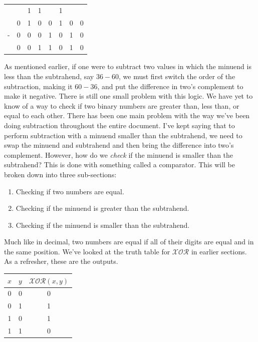 \documentclass[oneside]{book}
\begin{document}
\begin{center}
\begin{tabular}{c c c c c c c c}
& & 1 & 1 & & 1 & & \\
& 0 & 1 & 0 & 0 & 1 & 0 & 0 \\
- & 0 & 0 & 0 & 1 & 0 & 1 & 0\\
\hline
& 0 & 0 & 1 & 1 & 0 & 1 & 0\\
\end{tabular}
\end{center}
\tab
As mentioned earlier, if one were to subtract two values in which the minuend is less than the subtrahend, say $36-60$, we must first switch the order of the subtraction, making it $60-36$, and put the difference in two's complement to make it negative. There is still one small problem with this logic. We have yet to know of a way to check if two binary numbers are greater than, less than, or equal to each other.
\tab
There has been one main problem with the way we've been doing subtraction throughout the entire document. I've kept saying that to perform subtraction with a minuend smaller than the subtrahend, we need to swap the minuend and subtrahend and then bring the difference into two's complement. However, how do we \textit{check} if the minuend is smaller than the subtrahend? This is done with something called a comparator\cite{wiki:Digital_comparator}. This will be broken down into three sub-sections:
\begin{enumerate}
	\item Checking if two numbers are equal.
	\item Checking if the minuend is greater than the subtrahend.
	\item Checking if the minuend is smaller than the subtrahend.
\end{enumerate}
\tab
Much like in decimal, two numbers are equal if all of their digits are equal and in the same position. We've looked at the truth table for $\mathcal{XOR}$ in earlier sections. As a refresher, these are the outputs.
\begin{center}
\begin{tabular}{|c|c|c|}
\hline
$x$ & $y$ & $\mathcal{XOR}(x,y)$ \\
\hline
0 & 0 & 0 \\
0 & 1 & 1 \\
1 & 0 & 1 \\
1 & 1 & 0 \\
\hline
\end{tabular}
\end{center}
\end{document}
